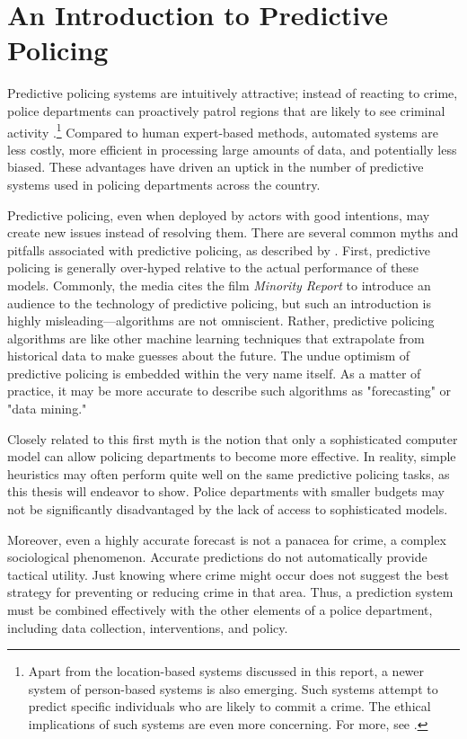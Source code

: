 \section{An Introduction to Predictive Policing}

Predictive policing systems are intuitively attractive; instead of reacting to crime, police departments can proactively patrol regions that are likely to see criminal activity \citep{perry_predictive_2013}.\footnote{Apart from the location-based systems discussed in this report, a newer system of person-based systems is also emerging. Such systems attempt to predict specific individuals who are likely to commit a crime. The ethical implications of such systems are even more concerning. For more, see \citet{robinson_stuck_2016}.} Compared to human expert-based methods, automated systems are less costly, more efficient in processing large amounts of data, and potentially less biased. These advantages have driven an uptick in the number of predictive systems used in policing departments across the country.

Predictive policing, even when deployed by actors with good intentions, may create new issues instead of resolving them. There are several common myths and pitfalls associated with predictive policing, as described by \citet{perry_predictive_2013}. First, predictive policing is generally over-hyped relative to the actual performance of these models. Commonly, the media cites the film \emph{Minority Report} to introduce an audience to the technology of predictive policing, but such an introduction is highly misleading---algorithms are not omniscient. Rather, predictive policing algorithms are like other machine learning techniques that extrapolate from historical data to make guesses about the future. The undue optimism of predictive policing is embedded within the very name itself. As a matter of practice, it may be more accurate to describe such algorithms as "forecasting" or "data mining."

Closely related to this first myth is the notion that only a sophisticated computer model can allow policing departments to become more effective. In reality, simple heuristics may often perform quite well on the same predictive policing tasks, as this thesis will endeavor to show. Police departments with smaller budgets may not be significantly disadvantaged by the lack of access to sophisticated models.

Moreover, even a highly accurate forecast is not a panacea for crime, a complex sociological phenomenon. Accurate predictions do not automatically provide tactical utility. Just knowing where crime might occur does not suggest the best strategy for preventing or reducing crime in that area. Thus, a prediction system must be combined effectively with the other elements of a police department, including data collection, interventions, and policy.

